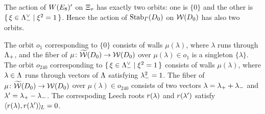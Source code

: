 \documentclass{amsart} %
\begin{document}
The action of $W(E_8)^{\prime}$ on $\Xi_{\tau}$ has exactly two orbits:
one is 
$\{0\}$ and the other is $\{\,{\xi\in \Lambda_{-}^{\vee}}\mid {\xi^2=1} \,\}$.
Hence the action of $\operatorname{Stab}_{\varGamma}(D_0)$ on $\mathord{\mathcal{W}}(D_0)$ 
has also two orbits.
\par
The orbit $o_1$ corresponding to $\{0\}$
consists of walls $\mu(\lambda)$,
where $\lambda$ runs through $\Lambda_{+}$,
and the fiber of $\mu\colon \widetilde{\mathord{\mathcal{W}}}(D_0)\to\mathord{\mathcal{W}}(D_0)$ 
over $\mu(\lambda)\in o_1$ is a singleton $\{\lambda\}$.
The orbit $o_{240}$ corresponding to $\{\,{\xi\in \Lambda_{-}^{\vee}}\mid {\xi^2=1} \,\}$
consists of walls $\mu(\lambda)$,
where $\lambda\in \Lambda$ runs through
vectors of $\Lambda$ satisfying ${\lambda}_{-}^2=1$.
The fiber of $\mu\colon \widetilde{\mathord{\mathcal{W}}}(D_0)\to\mathord{\mathcal{W}}(D_0)$ 
over $\mu(\lambda)\in o_{240}$ consists 
of two vectors
$\lambda={\lambda}_{+}+{\lambda}_{-}$ and $\lambda^{\prime}={\lambda}_{+}-{\lambda}_{-}$.
The correspoding Leech roots 
$r(\lambda)$ and $r(\lambda^{\prime})$ satisfy
$\langle r(\lambda), r(\lambda^{\prime}) \rangle_{\hskip -1pt L}=0$.
%
%
\end{document}

